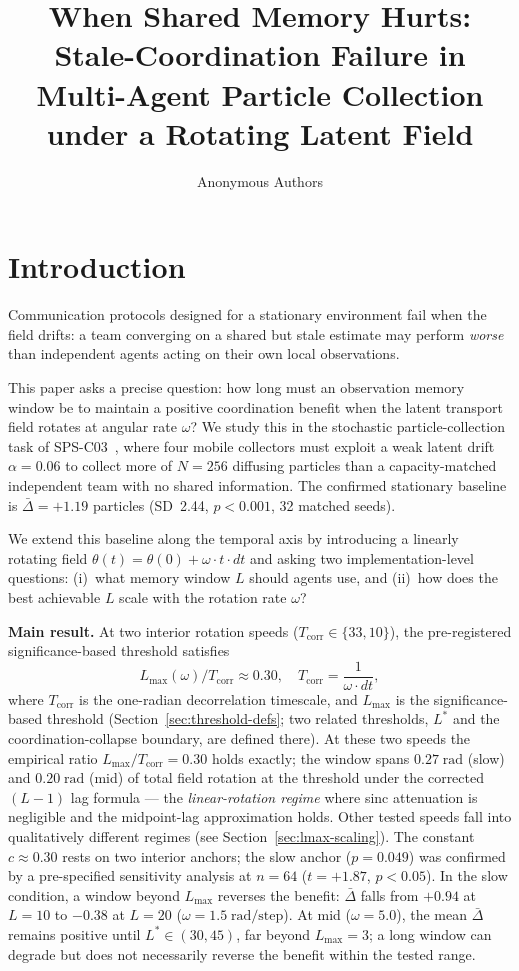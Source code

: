 \documentclass[sigconf,anonymous]{aamas}
\title{When Shared Memory Hurts: Stale-Coordination Failure in\\
       Multi-Agent Particle Collection under a Rotating Latent Field}
\author{Anonymous Authors}
\affiliation{%
  \institution{Anonymous Institution}
  \city{Anonymous City}
  \country{Anonymous Country}}
\newcommand{\Dbar}{\bar{\Delta}}
\newcommand{\Lmax}{L_{\max}}
\newcommand{\Tcorr}{T_{\mathrm{corr}}}
\newcommand{\omdt}{\omega\!\cdot\!dt}
\begin{document}
\maketitle

\section{Introduction}
\label{sec:intro}

Communication protocols designed for a stationary environment fail
when the field drifts: a team converging on a shared but stale estimate
may perform \emph{worse} than independent agents acting on their own
local observations.

This paper asks a precise question: how long must an observation
memory window be to maintain a positive coordination benefit
when the latent transport field rotates at angular rate $\omega$?
We study this in the stochastic particle-collection task of
SPS-C03~\cite{spsC03}, where four mobile collectors must exploit
a weak latent drift $\alpha{=}0.06$ to collect more of $N{=}256$
diffusing particles than a capacity-matched independent team
with no shared information. The confirmed stationary baseline is
$\Dbar{=}{+}1.19$ particles (SD~2.44, $p{<}0.001$, 32 matched
seeds).

We extend this baseline along the temporal axis by introducing
a linearly rotating field $\theta(t) = \theta(0) + \omega \cdot t
\cdot dt$ and asking two implementation-level questions: (i)~what
memory window $L$ should agents use, and (ii)~how does the best
achievable $L$ scale with the rotation rate $\omega$?

\medskip\noindent\textbf{Main result.}
At two interior rotation speeds ($\Tcorr \in \{33, 10\}$),
the pre-registered significance-based threshold satisfies
\[
  \Lmax(\omega) / \Tcorr \approx 0.30, \quad
  \Tcorr = \frac{1}{\omdt},
\]
where $\Tcorr$ is the one-radian decorrelation timescale,
and $\Lmax$ is the significance-based threshold
(Section~\ref{sec:threshold-defs}; two related thresholds, $L^*$
and the coordination-collapse boundary, are defined there).
At these two speeds the empirical ratio $\Lmax/\Tcorr = 0.30$
holds exactly; the window spans $0.27\;\text{rad}$ (slow) and
$0.20\;\text{rad}$ (mid) of total field rotation at the threshold
under the corrected $(L{-}1)$ lag formula — the
\emph{linear-rotation regime} where sinc attenuation is negligible
and the midpoint-lag approximation holds.
Other tested speeds fall into qualitatively different regimes
(see Section~\ref{sec:lmax-scaling}).
The constant $c \approx 0.30$ rests on two interior anchors;
the slow anchor ($p{=}0.049$) was confirmed by a pre-specified
sensitivity analysis at $n{=}64$ ($t{=}{+}1.87$, $p{<}0.05$).
In the slow condition, a window beyond $\Lmax$ reverses the benefit:
$\Dbar$ falls from $+0.94$ at $L{=}10$ to $-0.38$
at $L{=}20$ ($\omega{=}1.5\;\text{rad/step}$).
At mid ($\omega{=}5.0$), the mean $\Dbar$ remains positive until
$L^*{\in}(30,45)$, far beyond $\Lmax{=}3$; a long window can degrade but
does not necessarily reverse the benefit within the tested range.
\end{document}
